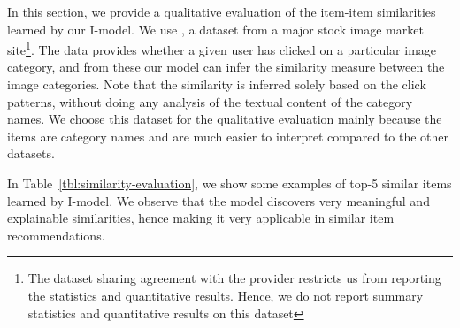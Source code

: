 In this section, we provide a qualitative evaluation of the item-item similarities learned by our I-\LinearLow model. 
We use \Fotolia, a dataset from a major stock image market site\footnote{\scriptsize The dataset sharing agreement with the provider restricts us from reporting the statistics and quantitative results. Hence, we do not report summary statistics and quantitative results on this dataset}.  
The data provides whether a given user has clicked on a particular image category, and from these our model can infer the similarity measure between
the image categories. Note that the similarity is inferred solely based on the click patterns, without doing any analysis of the textual content of
the category names.
We choose this dataset for the qualitative evaluation mainly because the items are category names and are much easier to interpret
compared to the other datasets.






In Table~\ref{tbl:similarity-evaluation}, we show some examples of top-5 similar items learned by I-\LinearLow model. We observe that the model 
discovers very meaningful and explainable similarities, hence making it very applicable in similar item recommendations.  
\begin{table*}
	\centering
	\caption{Top-5 similar items learned by I-\LinearLow model.}
	\label{tbl:similarity-evaluation}
	\setlength{\arrayrulewidth}{.2em}
\end{table*}




		

